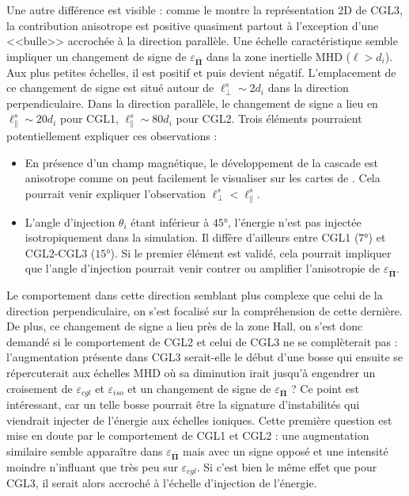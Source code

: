 Une autre différence est visible : comme le montre la représentation \acs{2D} de CGL3, la contribution anisotrope est positive quasiment partout à l'exception d'une <<bulle>> accrochée à la direction parallèle.
Une échelle caractéristique semble impliquer un changement de signe de $\varepsilon_{\overline{\boldsymbol{\Pi}}}$ dans la zone inertielle \acs{MHD} ($\ell > d_i$). Aux plus petites échelles, il est positif et puis devient négatif. L'emplacement de ce changement de signe est situé autour de $\ell^{s}_{\perp} \sim 2d_i$ dans la direction perpendiculaire. Dans la direction parallèle, le changement de signe a lieu en $\ell^{s}_{\parallel} \sim 20d_i$ pour CGL1, $\ell^{s}_{\parallel} \sim 80d_i$ pour CGL2. Trois éléments pourraient potentiellement expliquer ces observations : 
\begin{itemize}
    \item En présence d'un champ magnétique, le développement de la cascade est anisotrope comme on peut facilement le visualiser sur les cartes de \cite{manzini_local_2022}. Cela pourrait venir expliquer l'observation $\ell^{s}_{\perp}<\ell^{s}_{\parallel}$. 
    \item L'angle d'injection $\theta_i$ étant inférieur à $\ang{45}$, l'énergie n'est pas injectée isotropiquement dans la simulation. Il diffère d'ailleurs entre CGL1 ($\ang{7}$) et CGL2-CGL3 ($\ang{15}$). Si le premier élément est validé, cela pourrait impliquer que l'angle d'injection pourrait venir contrer ou amplifier l'anisotropie de $\varepsilon_{\overline{\boldsymbol{\Pi}}}$.      
\end{itemize}
Le comportement dans cette direction semblant plus complexe que celui de la direction perpendiculaire, on s'est focalisé sur la compréhension de cette dernière.
De plus, ce changement de signe a lieu près de la zone \acs{Hall}, on s'est donc demandé si le comportement de CGL2 et celui de CGL3 ne se complèterait pas : l'augmentation présente dans CGL3 serait-elle le début d'une bosse qui ensuite se répercuterait aux échelles  \acs{MHD} où sa diminution irait jusqu'à engendrer un croisement de $\varepsilon_{cgl}$ et $\varepsilon_{iso}$ et un changement de signe de $\varepsilon_{\overline{\boldsymbol{\Pi}}}$ ? Ce point est intéressant, car un telle bosse pourrait être la signature d'instabilités qui viendrait injecter de l'énergie aux échelles ioniques. Cette première question est mise en doute par le comportement de CGL1 et CGL2 : une augmentation similaire semble apparaître dans $\varepsilon_{\overline{\boldsymbol{\Pi}}}$  mais avec un signe opposé et une intensité moindre n'influant que très peu sur $\varepsilon_{cgl}$. Si c'est bien le même effet que pour CGL3, il serait alors accroché à l'échelle d'injection de l'énergie. 

